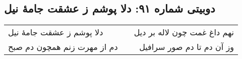\begin{center}
\section*{دوبیتی شماره ۹۱: دلا پوشم ز عشقت جامهٔ نیل}
\label{sec:091}
\begin{longtable}{l p{0.5cm} r}
دلا پوشم ز عشقت جامهٔ نیل
&&
نهم داغ غمت چون لاله بر دیل
\\
دم از مهرت زنم همچون دم صبح
&&
وز آن دم تا دم صور سرافیل
\\
\end{longtable}
\end{center}
